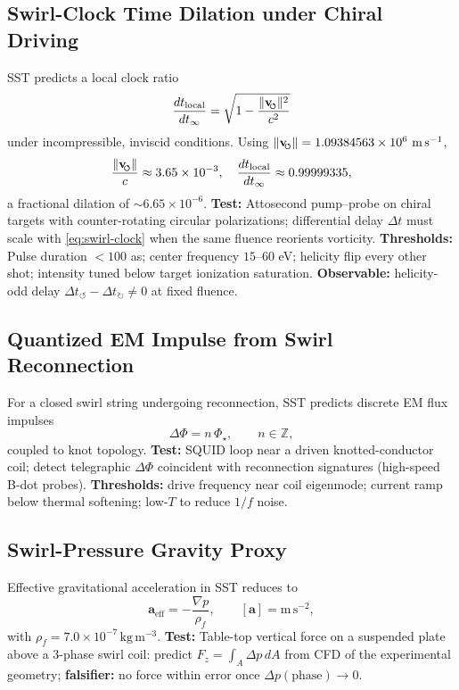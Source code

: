 \documentclass[10pt,reprint,aps,onecolumn,nofootinbib]{revtex4-2}
\newcommand{\vswirl}{\mathbf{v}_{\!\mkern-2mu\scriptscriptstyle\boldsymbol{\circlearrowleft}}}
\newcommand{\rhof}{\rho_{\!f}}                           %
\newcommand{\rhoF}{\rhof}
\begin{document}
        \subsection{Swirl-Clock Time Dilation under Chiral Driving}
        SST predicts a local clock ratio
        \begin{equation}
        \frac{dt_{\text{local}}}{dt_\infty}=\sqrt{1-\frac{\lVert \vswirl \rVert^2}{c^2}}
        \label{eq:swirl-clock}
        \end{equation}
        under incompressible, inviscid conditions. Using $\lVert \vswirl \rVert=1.09384563\times10^{6}\ \mathrm{m\,s^{-1}}$,
        \[
            \frac{\lVert \vswirl \rVert}{c}\approx 3.65\times 10^{-3},\quad
            \frac{dt_{\text{local}}}{dt_\infty}\approx 0.99999335,
        \]
        a fractional dilation of $\sim 6.65\times10^{-6}$. \textbf{Test:} Attosecond pump–probe on chiral targets with counter-rotating circular polarizations; differential delay $\Delta t$ must scale with \eqref{eq:swirl-clock} when the same fluence reorients vorticity. \textbf{Thresholds:} Pulse duration $<100$ as; center frequency $15$–$60$ eV; helicity flip every other shot; intensity tuned below target ionization saturation. \textbf{Observable:} helicity-odd delay $\Delta t_{\circlearrowleft}-\Delta t_{\circlearrowright}\neq 0$ at fixed fluence.

        \subsection{Quantized EM Impulse from Swirl Reconnection}
        For a closed swirl string undergoing reconnection, SST predicts discrete EM flux impulses
        \begin{equation}
        \Delta \Phi = n\,\Phi_\star,\qquad n\in\mathbb{Z},
        \end{equation}
        coupled to knot topology. \textbf{Test:} SQUID loop near a driven knotted-conductor coil; detect telegraphic $\Delta \Phi$ coincident with reconnection signatures (high-speed B-dot probes). \textbf{Thresholds:} drive frequency near coil eigenmode; current ramp below thermal softening; low-$T$ to reduce $1/f$ noise.

        \subsection{Swirl-Pressure Gravity Proxy}
        Effective gravitational acceleration in SST reduces to
        \begin{equation}
        \mathbf{a}_{\text{eff}}=-\frac{\nabla p}{\rhoF},\qquad [\mathbf{a}]=\mathrm{m\,s^{-2}},
        \end{equation}
        with $\rhoF=7.0\times10^{-7}\,\mathrm{kg\,m^{-3}}$. \textbf{Test:} Table-top vertical force on a suspended plate above a 3-phase swirl coil: predict $F_z=\int_A \Delta p\,dA$ from CFD of the experimental geometry; \textbf{falsifier:} no force within error once $\Delta p(\text{phase})\to 0$.
\end{document}
